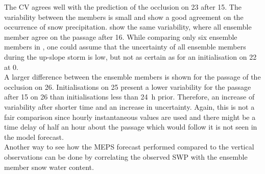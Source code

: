 \noindent
The CV agrees well with the prediction of the occlusion on \SI{23}{\dec} after \SI{15}{\UTC}. The variability between the members is small and show a good agreement on the occurrence of snow precipitation.  show the same variability, where all ensemble member agree on the passage after \SI{16}{\UTC}. While comparing only six ensemble members in , one could assume that the uncertainty of all ensemble members during the up-slope storm is low, but not as certain as for an initialisation on \SI{22}{\dec} at \SI{0}{\UTC}.
\\
A larger difference between the ensemble members is shown for the passage of the occlusion on \SI{26}{\dec}. Initialisations on \SI{25}{\dec} present a lower variability for the passage after \SI{15}{\UTC} on \SI{26}{\dec} than initialisations less than \SI{24}{\hour} prior. Therefore, an increase of variability after shorter time and an increase in uncertainty. Again, this is not a fair comparison since hourly instantaneous values are used and there might be a time delay of half an hour about the passage which would follow it is not seen in the model forecast. 
\\
Another way to see how the MEPS forecast performed compared to the vertical observations can be done by correlating the observed SWP with the ensemble member snow water content.
